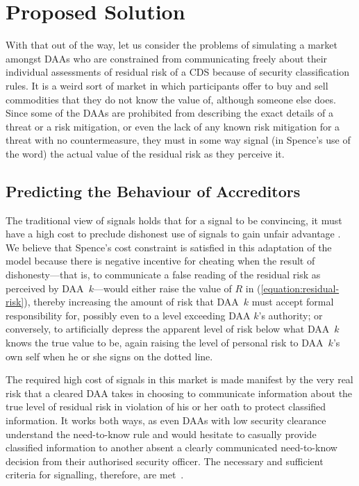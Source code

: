 \documentclass{llncs}
\begin{document}
\section{Proposed Solution}

With that out of the way, let us consider the problems of simulating a
market amongst DAAs who are constrained from communicating freely about
their individual assessments of residual risk of a CDS because of
security classification rules.  It is a weird sort of market in which
participants offer to buy and
sell commodities that they do not know the value of, although someone else
does.  Since some of the DAAs are prohibited from describing the exact details
of a threat or a risk mitigation, or even the lack of
any known risk mitigation for a threat with no countermeasure, they must
in some way signal (in Spence's use of the word) the actual value of the
residual risk as they perceive it.

\subsection{Predicting the Behaviour of Accreditors}

The traditional view of signals holds that for a signal to be convincing,
it must have a high cost to preclude dishonest use of signals to gain
unfair advantage \cite{Spence1973}.  We believe that Spence's cost
constraint is satisfied in this adaptation of the model because there
is negative incentive for cheating when the result of dishonesty---that is,
to communicate
a false reading of the residual risk as perceived by DAA~$k$---would
either raise the value of $R$ in (\ref{equation:residual-risk}), thereby
increasing the amount of risk that DAA~$k$ must accept formal
responsibility for, possibly even to a level exceeding DAA $k$'s
authority; or conversely, to artificially depress the apparent level of
risk below what DAA~$k$ knows the true value to be, again raising the
level of personal risk to DAA~$k$'s own self when he or she signs on
the dotted line.

The required high cost of signals in this market is made
manifest by the very real risk that a cleared DAA takes in choosing to
communicate information about the true level of residual risk in violation
of his or her oath to protect classified information.  It works both
ways, as even DAAs with low security clearance understand the need-to-know
rule and would hesitate to casually provide classified information to another
absent a clearly communicated need-to-know decision from their authorised
security officer.  The necessary and sufficient criteria for signalling, therefore, are
met~\cite[pp.\ 499--500 and 367, respectively]{Akerlof1970,Spence1973}.
\end{document}
